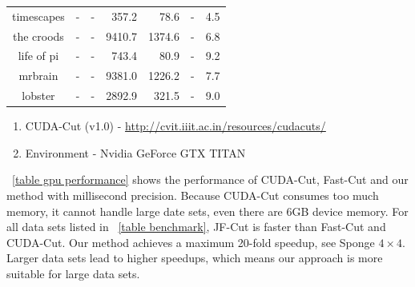 \begin{table}
{\begin{tabular}{@{ }c|r|r|r|r|r@{ }r@{ }}
    \hline
    timescapes  & -     & -     & 357.2     & 78.6      & -     & 4.5\\
    the croods  & -     & -     & 9410.7    & 1374.6    & -     & 6.8\\
    life of pi  & -     & -     & 743.4     & 80.9      & -     & 9.2\\
    \hline
    mrbrain     & -     & -     & 9381.0    & 1226.2    & -     & 7.7\\
    lobster     & -     & -     & 2892.9    & 321.5     & -     & 9.0\\
    \hline
    \end{tabular}
    \begin{tablenotes}
        \item {
        \begin{enumerate}
            \item CUDA-Cut (v1.0) - \url{http://cvit.iiit.ac.in/resources/cudacuts/}
            \item Environment - Nvidia GeForce GTX TITAN
        \end{enumerate}}
    \end{tablenotes}
}
\end{table}

\tablename \ \ref{table gpu performance} shows the performance of CUDA-Cut, Fast-Cut and our method with millisecond precision.
Because CUDA-Cut consumes too much memory, it cannot handle large date sets, even there are 6GB device memory.
For all data sets listed in \tablename \ \ref{table benchmark}, JF-Cut is faster than Fast-Cut and CUDA-Cut.
Our method achieves a maximum 20-fold speedup, see Sponge $4 \times 4$.
Larger data sets lead to higher speedups, which means our approach is more suitable for large data sets.

